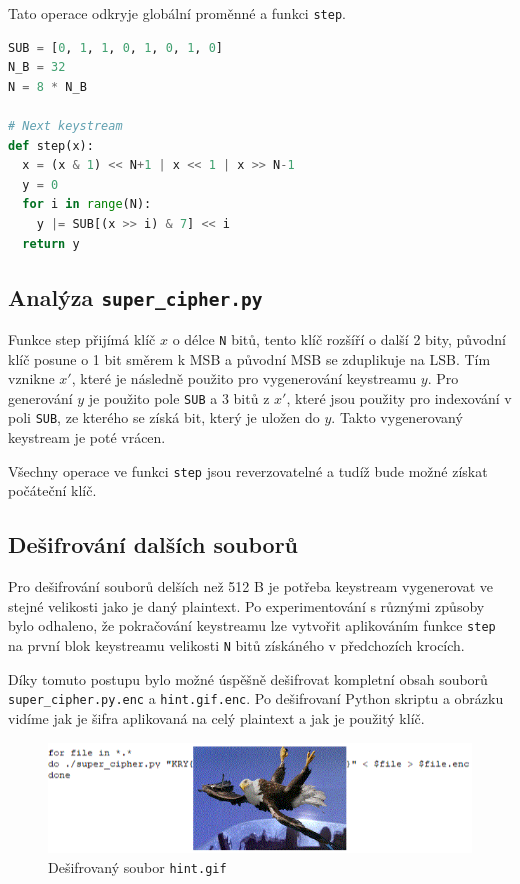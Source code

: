 \documentclass[11pt,a4paper]{article}
\begin{document}
Tato operace odkryje globální proměnné a funkci \texttt{step}.
\begin{lstlisting}[language=Python,caption={Část dešifrovaného \texttt{super\_cipher.py}}]
SUB = [0, 1, 1, 0, 1, 0, 1, 0]
N_B = 32
N = 8 * N_B

# Next keystream
def step(x):
  x = (x & 1) << N+1 | x << 1 | x >> N-1
  y = 0
  for i in range(N):
    y |= SUB[(x >> i) & 7] << i
  return y

\end{lstlisting}

\subsection{Analýza \texttt{super\_cipher.py}}
Funkce step přijímá klíč $x$ o délce \texttt{N} bitů, tento klíč rozšíří o další 2 bity, původní klíč posune o
1 bit směrem k MSB a původní MSB se zduplikuje na LSB. Tím vznikne $x'$, které je následně použito pro vygenerování
keystreamu $y$. Pro generování $y$ je použito pole \texttt{SUB} a 3 bitů z $x'$, které jsou použity pro indexování v
poli \texttt{SUB}, ze kterého se získá bit, který je uložen do $y$. Takto vygenerovaný keystream je poté vrácen.

Všechny operace ve funkci \texttt{step} jsou reverzovatelné a tudíž bude možné získat počáteční klíč.

\subsection{Dešifrování dalších souborů}

Pro dešifrování souborů delších než 512 B je potřeba keystream vygenerovat ve stejné velikosti jako je daný plaintext.
Po experimentování s různými způsoby bylo odhaleno, že pokračování keystreamu lze vytvořit aplikováním funkce
\texttt{step} na první blok keystreamu velikosti \texttt{N} bitů získáného v předchozích krocích.

Díky tomuto postupu bylo možné úspěšně dešifrovat kompletní obsah souborů \texttt{super\_cipher.py.enc} a
\texttt{hint.gif.enc}. Po dešifrovaní Python skriptu a obrázku vidíme jak je šifra aplikovaná na celý plaintext a jak
je použitý klíč.


\begin{figure}[h]
    \center
    \includegraphics[width=0.75\linewidth]{hint}
    \caption{Dešifrovaný soubor \texttt{hint.gif}}
\end{figure}
\end{document}
